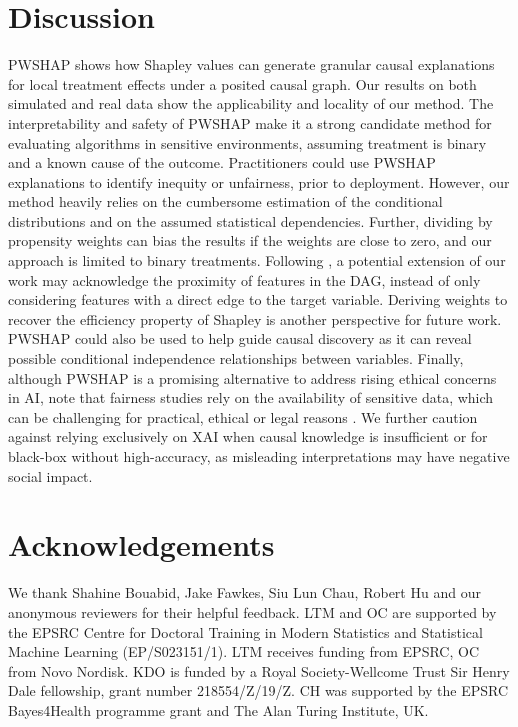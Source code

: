 \documentclass{article}
\theoremstyle{plain}
\theoremstyle{definition}
\theoremstyle{remark}
\theoremstyle{mystyle}
\begin{document}
\vspace*{-0.2cm}
\section{Discussion}

PWSHAP shows how Shapley values can generate granular causal explanations for local treatment effects under a posited causal graph. Our results on both simulated and real data show the applicability and locality of our method. The interpretability and safety of PWSHAP make it a strong candidate method for evaluating algorithms in sensitive environments, assuming treatment is binary and a known cause of the outcome. Practitioners could use PWSHAP explanations to identify inequity or unfairness, prior to deployment. However, our method heavily relies on the cumbersome estimation of the conditional distributions and on the assumed statistical dependencies. Further, dividing by propensity weights can bias the results if the weights are close to zero, and our approach is limited to binary treatments. Following , a potential extension of our work may acknowledge the proximity of features in the DAG, instead of only considering features with a direct edge to the target variable. Deriving weights to recover the efficiency property of Shapley is another perspective for future work. PWSHAP could also be used to help guide causal discovery as it can reveal possible conditional independence relationships between variables. 
Finally, although PWSHAP is a promising alternative to address rising ethical concerns in AI, note that fairness studies rely on the availability of sensitive data, which can be challenging for practical, ethical or legal reasons . We further caution against relying exclusively on XAI when causal knowledge is insufficient or for black-box without high-accuracy, as misleading interpretations may have negative social impact. 

\section*{Acknowledgements}
We thank Shahine Bouabid, Jake Fawkes, Siu Lun Chau, Robert Hu and our anonymous reviewers for their helpful feedback. LTM and OC are supported by the EPSRC Centre for Doctoral
Training in Modern Statistics and Statistical Machine Learning (EP/S023151/1). LTM receives funding from EPSRC, OC from Novo Nordisk. KDO is funded by a Royal Society-Wellcome Trust Sir Henry Dale fellowship,
grant number 218554/Z/19/Z. CH was supported by the EPSRC Bayes4Health programme grant and The Alan Turing Institute, UK.
\end{document}

